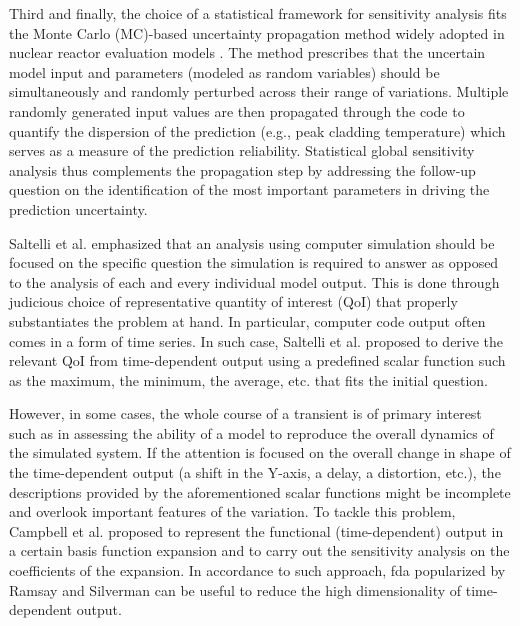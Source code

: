 Third and finally, 
the choice of a statistical framework for sensitivity analysis fits the Monte Carlo (MC)-based uncertainty propagation method widely adopted in nuclear reactor evaluation models \cite{Boyack1990, Nutt2004, Wallis2007, Glaeser2008}. 
The method prescribes that the uncertain model input and parameters (modeled as random variables) 
should be simultaneously and randomly perturbed across their range of variations. 
Multiple randomly generated input values are then propagated through the code to quantify the dispersion of the prediction (e.g., peak cladding temperature) 
which serves as a measure of the prediction reliability. 
Statistical global sensitivity analysis thus complements the propagation step 
by addressing the follow-up question on the identification of the most important parameters in driving the prediction uncertainty. 

Saltelli et al. \cite{Saltelli2006} emphasized that an analysis using computer simulation 
should be focused on the specific question the simulation is required to answer 
as opposed to the analysis of each and every individual model output. 
This is done through judicious choice of representative quantity of interest (QoI) 
that properly substantiates the problem at hand. 
In particular, computer code output often comes in a form of time series. 
In such case, Saltelli et al. \cite{Saltelli2008,Saltelli2004} proposed to derive the relevant QoI from time-dependent output 
using a predefined scalar function such as the maximum, the minimum, the average, etc. that fits the initial question.

However, in some cases, the whole course of a transient is of primary interest 
such as in assessing the ability of a model to reproduce the overall dynamics of the simulated system. 
If the attention is focused on the overall change in shape of the time-dependent output (a shift in the Y-axis, a delay, a distortion, etc.), 
the descriptions provided by the aforementioned scalar functions might be incomplete and overlook important features of the variation. 
To tackle this problem, Campbell et al. \cite{Campbell2006} proposed to represent the functional (time-dependent) output in a certain basis function expansion 
and to carry out the sensitivity analysis on the coefficients of the expansion. 
In accordance to such approach, \gls{fda} popularized by Ramsay and Silverman \cite{Ramsay2005} can be useful to reduce the high dimensionality of time-dependent output.

